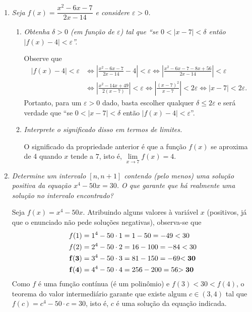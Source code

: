 \documentclass[12pt,a4paper]{article}
\newcommand*\abs[1]{\left|#1\right|}
\begin{document}
\begin{enumerate}
\begin{enumerate}
\end{enumerate}

\item \textit{ Seja $f(x) = \dfrac{x^2 - 6x - 7}{2x - 14}$ e considere $\varepsilon > 0$. }
\begin{enumerate}
\item \textit{ Obtenha $\delta > 0$ (em função de $\varepsilon$) tal que ``se $0 < |x - 7| < \delta$ então $|f(x) - 4| < \varepsilon$''. }


Observe que
\begin{align*}
\abs{f(x) - 4} < \varepsilon
& \Leftrightarrow \abs{ \frac{x^2 - 6x - 7}{2x - 14} - 4} < \varepsilon
  \Leftrightarrow \abs{ \frac{x^2 - 6x - 7 - 8x + 56}{2x - 14} } < \varepsilon \\
& \Leftrightarrow \abs{\frac{x^2 - 14x + 49}{2(x - 7)}} < \varepsilon
  \Leftrightarrow \abs{\frac{(x - 7)^2}{x - 7}} < 2\varepsilon
  \Leftrightarrow \abs{x - 7} < 2 \varepsilon.
\end{align*}
Portanto, para um $\varepsilon>0$ dado, basta escolher qualquer $\delta \leq 2\varepsilon$ e será verdade que ``se $0 < \abs{x - 7} < \delta$ então $\abs{f(x) - 4} < \varepsilon$''.

\item \textit{ Interprete o significado disso em termos de limites. }

O significado da propriedade anterior é que a função $f(x)$ se aproxima de 4 quando $x$ tende a $7$, isto é, $\lim\limits_{x\to7} f(x) = 4$.

\end{enumerate}

\item \textit{ Determine um intervalo $[n, n+1]$ contendo (pelo menos) uma solução positiva da equação $x^4 - 50x = 30$. O que garante que há realmente uma solução no intervalo encontrado? }

Seja $f(x) = x^4 - 50x$. Atribuindo alguns valores à variável $x$ (positivos, já que o enunciado não pede soluções negativas), observa-se que
\begin{align*}
f(1) & = 1^4 - 50 \cdot 1 = 1 - 50 = -49 < 30 \\
f(2) & = 2^4 - 50 \cdot 2 = 16 - 100 = -84 < 30 \\
\bf{ f(3) } & = 3^4 - 50 \cdot 3 = 81 - 150 = -69 \bf{ < 30 }\\
\bf{ f(4) } & = 4^4 - 50 \cdot 4 = 256 - 200 = 56 \bf{ > 30 }
\end{align*}
Como $f$ é uma função contínua (é um polinômio) e $f(3) < 30 < f(4)$, o teorema do valor intermediário garante que existe algum $c \in (3,4)$ tal que $f(c) = c^4 - 50 \cdot c = 30$, isto é, $c$ é uma solução da equação indicada.


\end{enumerate}
\end{document}
